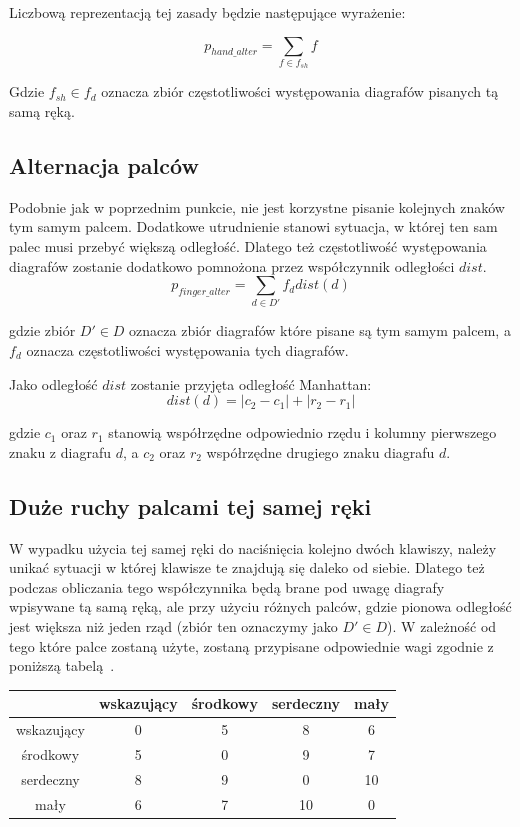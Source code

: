 \documentclass{xmgr}
\begin{document}
Liczbową reprezentacją tej zasady będzie następujące wyrażenie:

$$ p_{hand\_alter} = \sum\limits_{f \in f_{sh}} f $$

Gdzie $ f_{sh} \in f_d $ oznacza zbiór częstotliwości występowania diagrafów pisanych tą samą ręką.


\subsection{Alternacja palców}

Podobnie jak w poprzednim punkcie, nie jest korzystne pisanie kolejnych znaków tym samym palcem. Dodatkowe utrudnienie stanowi sytuacja, w której ten sam palec musi przebyć większą odległość. Dlatego też częstotliwość występowania diagrafów zostanie dodatkowo pomnożona przez współczynnik odległości $dist$.
$$ p_{finger\_alter} = \sum\limits_{d \in D'} f_d dist(d) $$

\noindent
gdzie zbiór $ D' \in D $ oznacza zbiór diagrafów które pisane są tym samym palcem, a $f_d$ oznacza częstotliwości występowania tych diagrafów.\newline

Jako odległość $dist$ zostanie przyjęta odległość Manhattan:
$$ dist(d) = |c_2 - c_1| + |r_2 - r_1| $$

gdzie $c_1$ oraz $r_1$ stanowią współrzędne odpowiednio rzędu i kolumny pierwszego znaku z diagrafu $d$, a $c_2$ oraz $r_2$ współrzędne drugiego znaku diagrafu $d$.


\subsection{Duże ruchy palcami tej samej ręki}

W wypadku użycia tej samej ręki do naciśnięcia kolejno dwóch klawiszy, należy unikać sytuacji w której klawisze te znajdują się daleko od siebie. Dlatego też podczas obliczania tego współczynnika będą brane pod uwagę diagrafy wpisywane tą samą ręką, ale przy użyciu różnych palców, gdzie pionowa odległość jest większa niż jeden rząd (zbiór ten oznaczymy jako $ D' \in D $). W zależność od tego które palce zostaną użyte, zostaną przypisane odpowiednie wagi zgodnie z poniższą tabelą~\cite{Eggers2003672}.\newline

\begin{tabular}{ c | c | c | c | c }
  & wskazujący & środkowy & serdeczny & mały \\
  \hline
  wskazujący & 0 & 5 & 8 & 6 \\
  środkowy & 5 & 0 & 9 & 7 \\
  serdeczny & 8 & 9 & 0 & 10 \\
  mały & 6 & 7 & 10 & 0 \\
\end{tabular}\newline\newline
\end{document}
